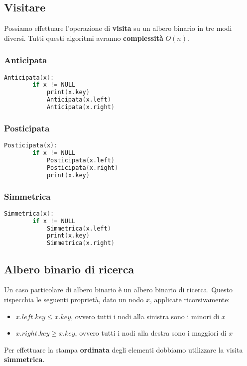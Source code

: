 \subsection{Visitare}
Possiamo effettuare l'operazione di \textbf{visita} su un albero binario in tre modi diversi. Tutti questi algoritmi avranno \textbf{complessità} $O(n)$.
\subsubsection{Anticipata}
\begin{lstlisting}[language=C, caption=Alberi con liste, mathescape=true]
	Anticipata(x):
		if x != NULL
			print(x.key)
			Anticipata(x.left)
			Anticipata(x.right)
\end{lstlisting}
\begin{example}
\end{example}
\subsubsection{Posticipata}
\begin{lstlisting}[language=C, caption=Alberi con liste, mathescape=true]
	Posticipata(x):
		if x != NULL
			Posticipata(x.left)
			Posticipata(x.right)
			print(x.key)
\end{lstlisting}
\begin{example}
\end{example}
\subsubsection{Simmetrica}
\begin{lstlisting}[language=C, caption=Alberi con liste, mathescape=true]
	Simmetrica(x):
		if x != NULL
			Simmetrica(x.left)
			print(x.key)
			Simmetrica(x.right)
\end{lstlisting}
\begin{example}
\end{example}
\subsection{Albero binario di ricerca}
Un caso particolare di albero binario è un albero binario di ricerca. Questo rispecchia le seguenti proprietà, dato un nodo $x$, applicate ricorsivamente:
\begin{itemize}
	\item $x.left.key \leq x.key$, ovvero tutti i nodi alla sinistra sono i minori di $x$
	\item $x.right.key \geq x.key$, ovvero tutti i nodi alla destra sono i maggiori di $x$
\end{itemize}
\begin{note}
	Per effettuare la stampa \textbf{ordinata} degli elementi dobbiamo utilizzare la visita \textbf{simmetrica}.
\end{note}
